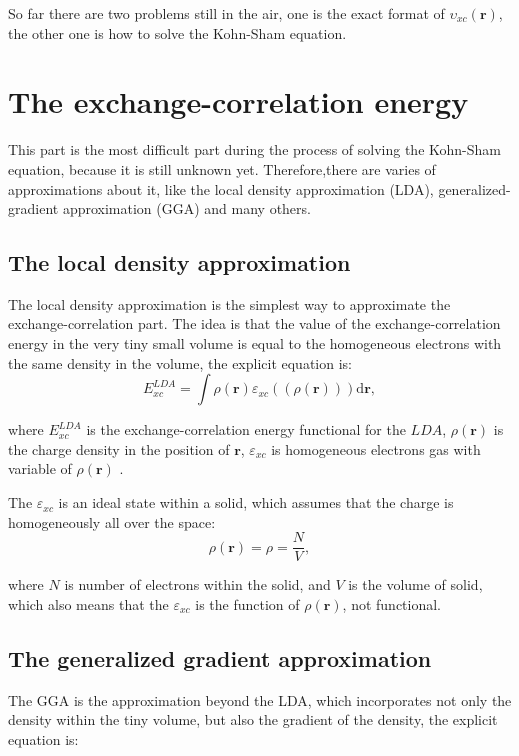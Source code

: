 \documentclass[a4paper, 12pt, titlepage,oneside,drop]{kthesis}
\begin{document}
\noindent So far there are two problems still in the air, one is the exact format of $\upsilon_\textit{xc}(\textbf{r})$, the other one is how to solve the Kohn-Sham equation.

\section{The exchange-correlation energy}
\noindent This part is the most difficult part during the process of solving the Kohn-Sham equation, because it is still unknown yet. Therefore,there
 are varies of approximations about it, like the local density approximation (LDA), generalized-gradient approximation (GGA) and many others.

\subsection{The local density approximation}
\noindent The local density approximation is the simplest way to approximate the exchange-correlation part. The idea is that the value 
of the exchange-correlation energy in the very tiny small volume is equal to the homogeneous electrons with the same density in 
the volume, the explicit equation is: 
\begin{equation}
 E^\textit{LDA}_\textit{xc} = \int \rho(\textbf{r}) \varepsilon_\textit{xc}( (\rho(\textbf{r})) ) \mathrm{d} \textbf{r}, 
\end{equation}

\noindent where $ E^\textit{LDA}_\textit{xc} $ is the exchange-correlation energy functional for the $LDA$, $\rho(\textbf{r})$ is the charge density in the position of $\textbf{r}$, $\varepsilon_\textit{xc}$ is homogeneous 
electrons gas with variable of  $\rho(\textbf{r})$ .

\noindent The $\varepsilon_\textit{xc}$ is an ideal state within a solid, which assumes that the charge is homogeneously all over the space:
\begin{equation}
 \rho(\textbf{r}) = \rho = \frac{N}{V},
\end{equation}

\noindent where $N$ is number of electrons within the solid, and $V$ is the volume of solid, which also means that the $\varepsilon_\textit{xc}$ is the function of $\rho(\textbf{r})$,
 not functional. 
\subsection{The generalized gradient approximation}
\noindent The GGA is the approximation beyond the LDA, which incorporates not only the density within the tiny volume, but also the gradient
 of the density, the explicit equation is:
\end{document}
